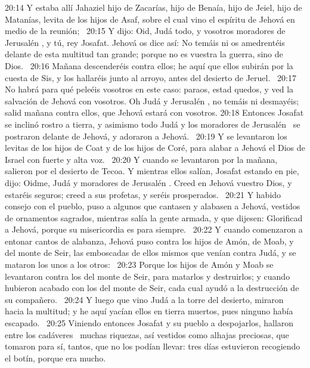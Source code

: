 																				20:14 Y estaba allí Jahaziel hijo de Zacarías, hijo de Benaía, hijo de Jeiel, hijo de Matanías, levita de los hijos de Asaf, sobre el cual vino el espíritu de Jehová en medio de la reunión;  
																				20:15 Y dijo: Oid, Judá todo, y vosotros moradores de Jerusalén , y tú, rey Josafat. Jehová os dice así: No temáis ni os amedrentéis delante de esta multitud tan grande; porque no es vuestra la guerra, sino de Dios.  
																				20:16 Mañana descenderéis contra ellos; he aquí que ellos subirán por la cuesta de Sis, y los hallaréis junto al arroyo, antes del desierto de Jeruel.  
																				20:17 No habrá para qué peleéis vosotros en este caso: paraos, estad quedos, y ved la salvación de Jehová con vosotros. Oh Judá y Jerusalén , no temáis ni desmayéis; salid mañana contra ellos, que Jehová estará con vosotros. 
																				20:18 Entonces Josafat se inclinó rostro a tierra, y asimismo todo Judá y los moradores de Jerusalén  se postraron delante de Jehová, y adoraron a Jehová.  
																				20:19 Y se levantaron los levitas de los hijos de Coat y de los hijos de Coré, para alabar a Jehová el Dios de Israel con fuerte y alta voz.  
																				20:20 Y cuando se levantaron por la mañana, salieron por el desierto de Tecoa. Y mientras ellos salían, Josafat estando en pie, dijo: Oidme, Judá y moradores de Jerusalén . Creed en Jehová vuestro Dios, y estaréis seguros; creed a sus profetas, y seréis prosperados.  
																				20:21 Y habido consejo con el pueblo, puso a algunos que cantasen y alabasen a Jehová, vestidos de ornamentos sagrados, mientras salía la gente armada, y que dijesen: Glorificad a Jehová, porque su misericordia es para siempre.  
																				20:22 Y cuando comenzaron a entonar cantos de alabanza, Jehová puso contra los hijos de Amón, de Moab, y del monte de Seir, las emboscadas de ellos mismos que venían contra Judá, y se mataron los unos a los otros:  
																				20:23 Porque los hijos de Amón y Moab se levantaron contra los del monte de Seir, para matarlos y destruirlos; y cuando hubieron acabado con los del monte de Seir, cada cual ayudó a la destrucción de su compañero.  
																				20:24 Y luego que vino Judá a la torre del desierto, miraron hacia la multitud; y he aquí yacían ellos en tierra muertos, pues ninguno había escapado.  
																				20:25 Viniendo entonces Josafat y su pueblo a despojarlos, hallaron entre los cadáveres  muchas riquezas, así vestidos como alhajas preciosas, que tomaron para sí, tantos, que no los podían llevar: tres días estuvieron recogiendo el botín, porque era mucho.  
